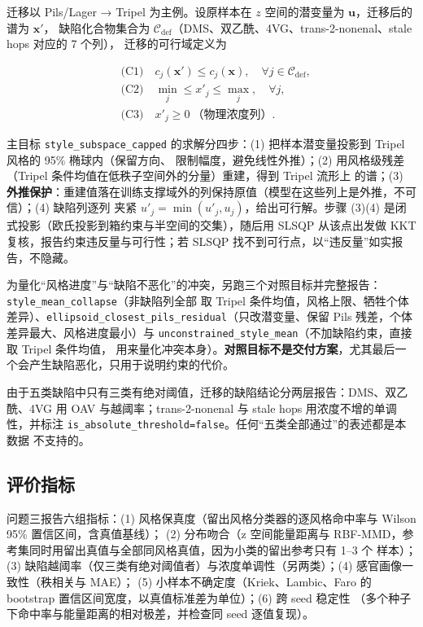 \documentclass[
  a4paper,12pt]{article}
\newcounter{none} %
\begin{document}
迁移以 Pils/Lager → Tripel 为主例。设原样本在 \(z\) 空间的潜变量为
\(\mathbf{u}\)，迁移后的谱为 \(\mathbf{x}'\)， 缺陷化合物集合为
\(\mathcal{C}_{\text{def}}\)（DMS、双乙酰、4VG、trans-2-nonenal、stale
hops 对应的 7 个列）， 迁移的可行域定义为

\[
\begin{aligned}
&\text{(C1)}\quad c_j(\mathbf{x}')\le c_j(\mathbf{x}),\quad \forall j\in\mathcal{C}_{\text{def}},\\
&\text{(C2)}\quad \min_j\le x'_j\le\max_j,\quad \forall j,\\
&\text{(C3)}\quad x'_j\ge 0\ \text{（物理浓度列）}.
\end{aligned}
\]

主目标 \texttt{style\_subspace\_capped} 的求解分四步：(1)
把样本潜变量投影到 Tripel 风格的 95\% 椭球内（保留方向、
限制幅度，避免线性外推）；(2) 用风格级残差（Tripel
条件均值在低秩子空间外的分量）重建，得到 Tripel 流形上 的谱；(3)
\textbf{外推保护}：重建值落在训练支撑域外的列保持原值（模型在这些列上是外推，不可信）；(4)
缺陷列逐列 夹紧 \(u'_j=\min(u'_j,u_j)\)，给出可行解。步骤 (3)(4)
是闭式投影（欧氏投影到箱约束与半空间的交集），随后用 SLSQP 从该点出发做
KKT 复核，报告约束违反量与可行性；若 SLSQP
找不到可行点，以``违反量''如实报告，不隐藏。

为量化``风格进度''与``缺陷不恶化''的冲突，另跑三个对照目标并完整报告：\texttt{style\_mean\_collapse}（非缺陷列全部
取 Tripel
条件均值，风格上限、牺牲个体差异）、\texttt{ellipsoid\_closest\_pils\_residual}（只改潜变量、保留
Pils 残差，个体差异最大、风格进度最小）与
\texttt{unconstrained\_style\_mean}（不加缺陷约束，直接取 Tripel
条件均值，
用来量化冲突本身）。\textbf{对照目标不是交付方案}，尤其最后一个会产生缺陷恶化，只用于说明约束的代价。

由于五类缺陷中只有三类有绝对阈值，迁移的缺陷结论分两层报告：DMS、双乙酰、4VG
用 OAV 与越阈率；trans-2-nonenal 与 stale hops
用浓度不增的单调性，并标注
\texttt{is\_absolute\_threshold=false}。任何``五类全部通过''的表述都是本数据
不支持的。

\subsection{评价指标}\label{ux8bc4ux4ef7ux6307ux6807-1}

问题三报告六组指标：(1) 风格保真度（留出风格分类器的逐风格命中率与
Wilson 95\% 置信区间，含真值基线）； (2) 分布吻合（z 空间能量距离与
RBF-MMD，参考集同时用留出真值与全部同风格真值，因为小类的留出参考只有
1--3 个 样本）；(3)
缺陷越阈率（仅三类有绝对阈值者）与浓度单调性（另两类）；(4)
感官画像一致性（秩相关与 MAE）； (5) 小样本不确定度（Kriek、Lambic、Faro
的 bootstrap 置信区间宽度，以真值标准差为单位）；(6) 跨 seed 稳定性
（多个种子下命中率与能量距离的相对极差，并检查同 seed 逐值复现）。
\end{document}
